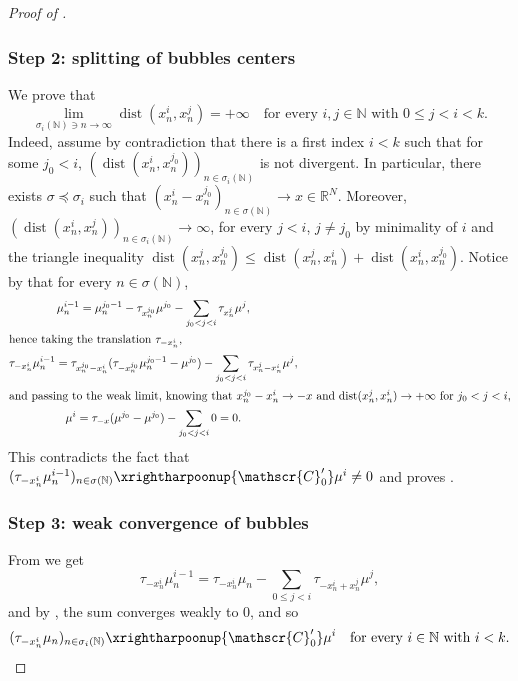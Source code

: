 \documentclass[JEP,XML,SOM,Unicode,published]{cedram}
\theoremstyle{plain}
\theoremstyle{definition}
\newcommand{\N}{\mathbb{N}}
\newcommand{\R}{\mathbb{R}}
\newcommand{\Cspace}{\mathscr{C}}
\DeclareMathOperator{\dist}{dist}
\newcommand{\mweakto}{\xrightharpoonup{\Cspace_0'}}
\begin{document}
\begin{proof}[Proof of ]
\subsubsection*{Step 2: splitting of bubbles centers} We prove that
\begin{equation}\label{splittingWeak}
\lim_{\sigma_i(\N) \ni n\to\infty} \dist(x^i_{n},x^j_{n}) =+\infty \quad\text{for every \(i,j\in\N\) with \(0\le j<i<k\)}.
\end{equation}
Indeed, assume by contradiction that there is a first index \(i<k\) such that for some \(j_0<i\), \((\dist(x^i_{n},x^{j_0}_{n}))_{n\in\sigma_i(\N)}\) is not divergent. In particular, there exists \(\sigma\preceq\sigma_i\) such that \((x^i_{n}-x^{j_0}_{n})_{n\in\sigma(\N)}\to x\in\R^N\). Moreover, \((\dist(x^i_n,x^j_n))_{n\in\sigma_i(\N)}\to\infty\), for every \(j<i\), \(j\neq j_0\) by minimality of $i$ and the triangle inequality $\dist(x_n^j,x_n^{j_0}) \leq \dist(x_n^j,x_n^i) + \dist(x_n^i,x_n^{j_0})$. Notice by  that for every $n\in \sigma(\N)$,
\begin{gather*}
\mu_n^{i-1} = \mu_n^{j_0-1} - \tau_{x_n^{j_0}} \mu^{j_0} - \sum_{j_0 < j < i} \tau_{x_n^j} \mu^j,\\
\shortintertext{hence taking the translation $\tau_{-x_n^i}$,}
\tau_{-x_n^i} \mu_n^{i-1} = \tau_{x_n^{j_0}-x_n^i} (\tau_{-x_n^{j_0}} \mu_n^{j_0-1}-\mu^{j_0}) - \sum_{j_0 < j < i} \tau_{x_n^j-x_n^i} \mu^j,\\
\shortintertext{and passing to the weak limit, knowing that $x_n^{j_0}-x_n^i \to -x$ and $\dist(x_n^j,x_n^i) \to +\infty$ for $j_0 < j <i$,}
\mu^i = \tau_{-x}(\mu^{j_0}-\mu^{j_0}) - \sum_{j_0 < j < i} 0 = 0.
\end{gather*}
This contradicts the fact that \((\tau_{-x^i_n}\mu^{i-1}_n)_{n\in\sigma(\N)}\mweakto\mu^i\neq 0\) and proves .

\subsubsection*{Step 3: weak convergence of bubbles}
From  we get\vspace*{-3pt}
\begin{equation}\label{bubbleWeak}
\tau_{-x^i_n}\mu^{i-1}_n =\tau_{-x^i_n}\mu_n-\sum_{0\le j<i}\tau_{-x^i_n+x^j_n}\mu^j,
\end{equation}
and by , the sum converges weakly to $0$, and so\vspace*{-3pt}\enlargethispage{\baselineskip}
\begin{equation}\label{bubbleWeakConvergence}
(\tau_{-x^i_n}\mu_n)_{n\in\sigma_i(\N)}\mweakto \mu^i\quad\text{for every \(i\in\N\) with \(i<k\)}.
\end{equation}


\end{proof}
\end{document}
